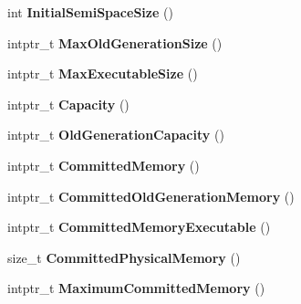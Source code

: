 \begin{DoxyCompactItemize}
\item 
int {\bfseries Initial\+Semi\+Space\+Size} ()\hypertarget{classv8_1_1internal_1_1_heap_aa14059e13579c9035eb517603d7a075a}{}\label{classv8_1_1internal_1_1_heap_aa14059e13579c9035eb517603d7a075a}

\item 
intptr\+\_\+t {\bfseries Max\+Old\+Generation\+Size} ()\hypertarget{classv8_1_1internal_1_1_heap_a03f9e59f9b28d86fe392b01530a59803}{}\label{classv8_1_1internal_1_1_heap_a03f9e59f9b28d86fe392b01530a59803}

\item 
intptr\+\_\+t {\bfseries Max\+Executable\+Size} ()\hypertarget{classv8_1_1internal_1_1_heap_a5d5a8d60465fbf66d2468c781d764f7d}{}\label{classv8_1_1internal_1_1_heap_a5d5a8d60465fbf66d2468c781d764f7d}

\item 
intptr\+\_\+t {\bfseries Capacity} ()\hypertarget{classv8_1_1internal_1_1_heap_ad7150b0b8779df02426caf208d4b461b}{}\label{classv8_1_1internal_1_1_heap_ad7150b0b8779df02426caf208d4b461b}

\item 
intptr\+\_\+t {\bfseries Old\+Generation\+Capacity} ()\hypertarget{classv8_1_1internal_1_1_heap_a08a52c707408223712af8dda448363f7}{}\label{classv8_1_1internal_1_1_heap_a08a52c707408223712af8dda448363f7}

\item 
intptr\+\_\+t {\bfseries Committed\+Memory} ()\hypertarget{classv8_1_1internal_1_1_heap_ac3e40b6212e1e969d3d1957bbf4aafb9}{}\label{classv8_1_1internal_1_1_heap_ac3e40b6212e1e969d3d1957bbf4aafb9}

\item 
intptr\+\_\+t {\bfseries Committed\+Old\+Generation\+Memory} ()\hypertarget{classv8_1_1internal_1_1_heap_adf050728911b0776ebc2346e6d7e8457}{}\label{classv8_1_1internal_1_1_heap_adf050728911b0776ebc2346e6d7e8457}

\item 
intptr\+\_\+t {\bfseries Committed\+Memory\+Executable} ()\hypertarget{classv8_1_1internal_1_1_heap_a27cdc86dcaa54ae8db2a14d9a466b10c}{}\label{classv8_1_1internal_1_1_heap_a27cdc86dcaa54ae8db2a14d9a466b10c}

\item 
size\+\_\+t {\bfseries Committed\+Physical\+Memory} ()\hypertarget{classv8_1_1internal_1_1_heap_a00917af74400fd38e6cd42c1d0450cdf}{}\label{classv8_1_1internal_1_1_heap_a00917af74400fd38e6cd42c1d0450cdf}

\item 
intptr\+\_\+t {\bfseries Maximum\+Committed\+Memory} ()\hypertarget{classv8_1_1internal_1_1_heap_a3d655d02711a7ab692c2d978abdf8f70}{}\label{classv8_1_1internal_1_1_heap_a3d655d02711a7ab692c2d978abdf8f70}


\end{DoxyCompactItemize}
